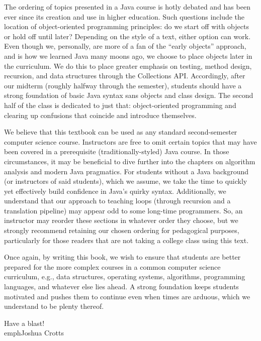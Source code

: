 The ordering of topics presented in a Java course is hotly debated and has been ever since its creation and use in higher education. Such questions include the location of object-oriented programming principles: do we start off with objects or hold off until later? Depending on the style of a text, either option can work. Even though we, personally, are more of a fan of the ``early objects'' approach, and is how we learned Java many moons ago, we choose to place objects later in the curriculum. We do this to place greater emphasis on testing, method design, recursion, and data structures through the Collections API. Accordingly, after our midterm (roughly halfway through the semester), students should have a strong foundation of basic Java syntax sans objects and class design. The second half of the class is dedicated to just that: object-oriented programming and clearing up confusions that coincide and introduce themselves. 

We believe that this textbook can be used as any standard second-semester computer science course. Instructors are free to omit certain topics that may have been covered in a prerequisite (traditionally-styled) Java course. In those circumstances, it may be beneficial to dive further into the chapters on algorithm analysis and modern Java pragmatics. For students without a Java background (or instructors of said students), which we assume, we take the time to quickly yet effectively build confidence in Java's quirky syntax. Additionally, we understand that our approach to teaching loops (through recursion and a translation pipeline) may appear odd to some long-time programmers. So, an instructor may reorder these sections in whatever order they choose, but we strongly recommend retaining our chosen ordering for pedagogical purposes, particularly for those readers that are not taking a college class using this text.

Once again, by writing this book, we wish to ensure that students are better prepared for the more complex courses in a common computer science curriculum, e.g., data structures, operating systems, algorithms, programming languages, and whatever else lies ahead. A strong foundation keeps students motivated and pushes them to continue even when times are arduous, which we understand to be plenty thereof.

\begin{flushright}
Have a blast!\\emph{Joshua Crotts}
\end{flushright}